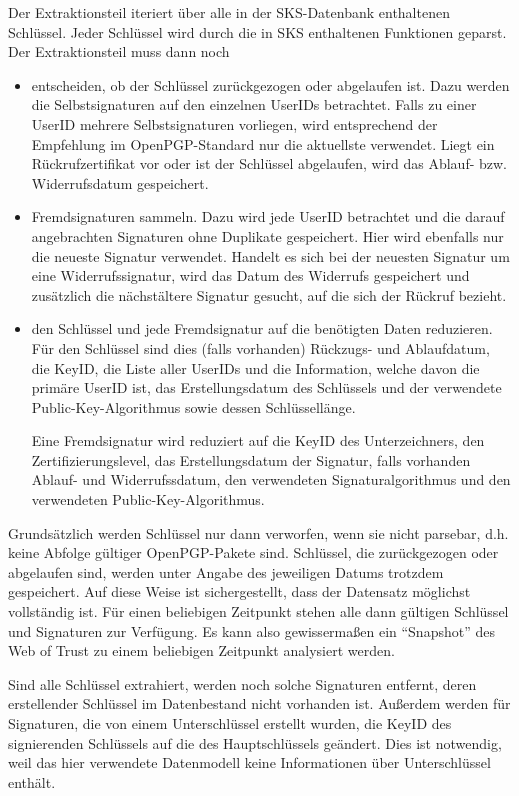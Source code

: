 Der Extraktionsteil iteriert über alle in der SKS-Datenbank
enthaltenen Schlüssel. Jeder Schlüssel wird durch die in SKS
enthaltenen Funktionen geparst. Der Extraktionsteil muss dann noch
\begin{itemize}
\item entscheiden, ob der Schlüssel zurückgezogen oder abgelaufen
  ist. Dazu werden die Selbstsignaturen auf den einzelnen UserIDs
  betrachtet. Falls zu einer UserID mehrere Selbstsignaturen
  vorliegen, wird entsprechend der Empfehlung im OpenPGP-Standard nur
  die aktuellste verwendet. Liegt ein Rückrufzertifikat vor oder ist
  der Schlüssel abgelaufen, wird das Ablauf- bzw. Widerrufsdatum
  gespeichert.
\item Fremdsignaturen sammeln. Dazu wird jede UserID betrachtet und
  die darauf angebrachten Signaturen ohne Duplikate gespeichert. Hier
  wird ebenfalls nur die neueste Signatur verwendet. Handelt es sich
  bei der neuesten Signatur um eine Widerrufssignatur, wird das Datum
  des Widerrufs gespeichert und zusätzlich die nächstältere Signatur
  gesucht, auf die sich der Rückruf bezieht.
\item den Schlüssel und jede Fremdsignatur auf die benötigten Daten
  reduzieren. Für den Schlüssel sind dies (falls vorhanden) Rückzugs-
  und Ablaufdatum, die KeyID, die Liste aller UserIDs und die
  Information, welche davon die primäre UserID ist, das
  Erstellungsdatum des Schlüssels und der verwendete
  Public-Key-Algorithmus sowie dessen Schlüssellänge.

  Eine Fremdsignatur wird reduziert auf die KeyID des Unterzeichners, 
  den Zertifizierungslevel, das Erstellungsdatum der Signatur,
  falls vorhanden Ablauf- und Widerrufssdatum, den verwendeten
  Signaturalgorithmus und den verwendeten Public-Key-Algorithmus.
\end{itemize}

Grundsätzlich werden Schlüssel nur dann verworfen, wenn sie nicht
parsebar, d.h. keine Abfolge gültiger OpenPGP-Pakete sind. Schlüssel,
die zurückgezogen oder abgelaufen sind, werden unter Angabe des
jeweiligen Datums trotzdem gespeichert. Auf diese Weise ist
sichergestellt, dass der Datensatz möglichst vollständig ist. Für
einen beliebigen Zeitpunkt stehen alle dann gültigen Schlüssel und
Signaturen zur Verfügung. Es kann also gewissermaßen ein
"`Snapshot"' des Web of Trust zu einem beliebigen Zeitpunkt
analysiert werden.

Sind alle Schlüssel extrahiert, werden noch solche Signaturen
entfernt, deren erstellender Schlüssel im Datenbestand nicht vorhanden
ist. Außerdem werden für Signaturen, die von einem Unterschlüssel
erstellt wurden, die KeyID des signierenden Schlüssels auf die des
Hauptschlüssels geändert. Dies ist notwendig, weil das hier
verwendete Datenmodell keine Informationen über Unterschlüssel
enthält.

